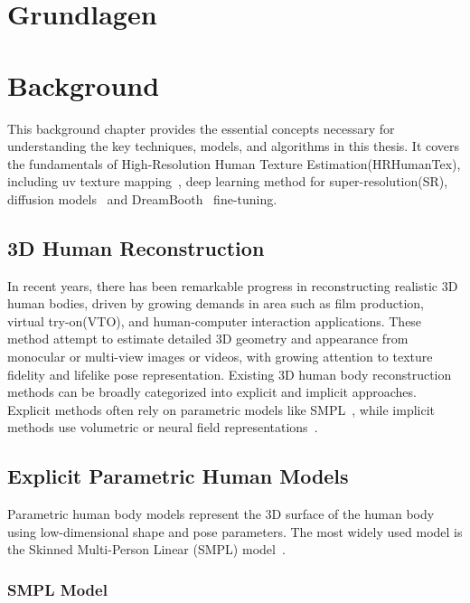 {\chapter{Grundlagen}}
{\chapter{Background}}
\label{sec:background}


This background chapter provides the essential concepts necessary for understanding the key techniques, models, and algorithms in this thesis. It covers the fundamentals of High-Resolution Human Texture Estimation(HRHumanTex), including uv texture mapping~\cite{10.1145/566654.566590}, deep learning method for super-resolution(SR), diffusion models~\cite{rombach2021highresolution} and DreamBooth~\cite{ruiz2023dreamboothfinetuningtexttoimage} fine-tuning.

\section{3D Human Reconstruction}

In recent years, there has been remarkable progress in reconstructing realistic 3D human bodies, driven by growing demands in area such as film production, virtual try-on(VTO), and human-computer interaction applications. These method attempt to estimate detailed 3D geometry and appearance from monocular or multi-view images or videos, with growing attention to texture fidelity and lifelike pose representation. Existing 3D human body reconstruction methods can be broadly categorized into explicit and implicit approaches.
Explicit methods often rely on parametric models like SMPL~\cite{SMPL:2015}, while implicit methods use volumetric or neural field representations~\cite{mildenhall2020nerf}.


\section{Explicit Parametric Human Models}

Parametric human body models represent the 3D surface of the human body using low-dimensional shape and pose parameters. The most widely used model is the Skinned Multi-Person Linear (SMPL) model~\cite{SMPL:2015}.

\subsection{SMPL Model}

